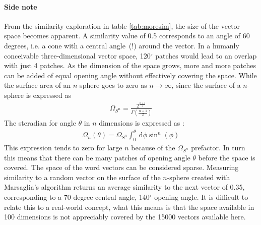 \documentclass[10pt, a4paper]{UUThesisTemplate}
\begin{document}
\paragraph{Side note}
From the similarity exploration in table \ref{tab:moresim}, the size of the vector space becomes apparent. A similarity value of 0.5 corresponds to an angle of 60 degrees, i.e. a cone with a central angle~(!) around the vector. In a humanly conceivable three-dimensional vector space, 120${}^\circ$ patches would lead to an overlap with just 4 patches. As the dimension of the space grows, more and more patches can be added of equal opening angle without effectively covering the space. While the surface area of an $n$-sphere goes to zero as $n\to\infty$, since the surface of a $n$-sphere is expressed as
\begin{align}
\Omega_{S^n} = \frac{2^{\frac{n+1}2}}{\Gamma(\frac{n+1}2)}
\end{align}
The steradian for angle $\theta$ in $n$ dimensions is expressed as \cite{mathstack}:
\begin{align}
\Omega_n(\theta) = \Omega_{S^n} \int_0^\theta ~\text{d}\phi \sin^n(\phi)
\end{align}
This expression tends to zero for large $n$ because of the $\Omega_{S^n}$ prefactor. In turn this means that there can be many patches of opening angle $\theta$ before the space is covered. The space of the word vectors can be considered sparse. Measuring similarity to a random vector on the surface of the $n$-sphere created with Marsaglia's algorithm \cite{marsaglia} returns an average similarity to the next vector of 0.35, corresponding to a 70 degree central angle, 140${}^\circ$ opening angle. It is difficult to relate this to a real-world concept, what this means is that the space available in 100 dimensions is not appreciably covered by the 15000 vectors available here.

\end{document}
